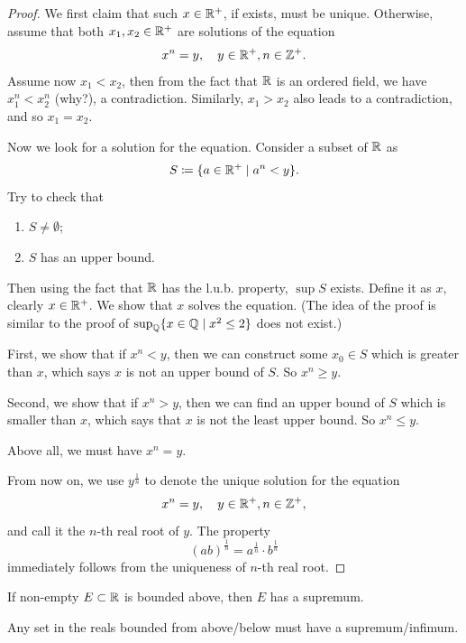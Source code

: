 \begin{proof}
We first claim that such $x\in\mathbb R^+$, if exists, must be unique. Otherwise, assume that both $x_1,x_2\in\mathbb R^+$ are solutions of the equation
\[x^n=y,\quad y\in\mathbb R^+,n\in\mathbb Z^+.\]
Assume now $x_1<x_2$, then from the fact that $\mathbb R$ is an ordered field, we have $x_1^n<x_2^n$ (why?), a contradiction. Similarly, $x_1>x_2$ also leads to a contradiction, and so $x_1=x_2$.

Now we look for a solution for the equation. Consider a subset of $\mathbb R$ as
\[S\coloneqq\{a\in\mathbb R^+\mid a^n<y\}.\]
Try to check that
\begin{enumerate}[label=(\arabic*)]
\item $S\neq\emptyset$;
\item $S$ has an upper bound.
\end{enumerate}
Then using the fact that $\mathbb R$ has the l.u.b. property, $\sup S$ exists. Define it as $x$, clearly $x\in\mathbb R^+$. We show that $x$ solves the equation. (The idea of the proof is similar to the proof of $\sup_\mathbb Q\{x\in\mathbb Q\mid x^2\le2\}$ does not exist.)

First, we show that if $x^n<y$, then we can construct some $x_0\in S$ which is greater than $x$, which says $x$ is not an upper bound of $S$. So $x^n\ge y$.

Second, we show that if $x^n>y$, then we can find an upper bound of $S$ which is smaller than $x$, which says that $x$ is not the least upper bound. So $x^n\le y$.

Above all, we must have $x^n=y$.

From now on, we use $y^\frac{1}{n}$ to denote the unique solution for the equation
\[x^n=y,\quad y\in\mathbb R^+,n\in\mathbb Z^+,\]
and call it the $n$-th real root of $y$. The property
\[(ab)^\frac{1}{n}=a^\frac{1}{n}\cdot b^\frac{1}{n}\]
immediately follows from the uniqueness of $n$-th real root.
\end{proof}

\begin{theorem}
If non-empty $E\subset\mathbb R$ is bounded above, then $E$ has a supremum.
\end{theorem}

Any set in the reals bounded from above/below must have a supremum/infimum.

